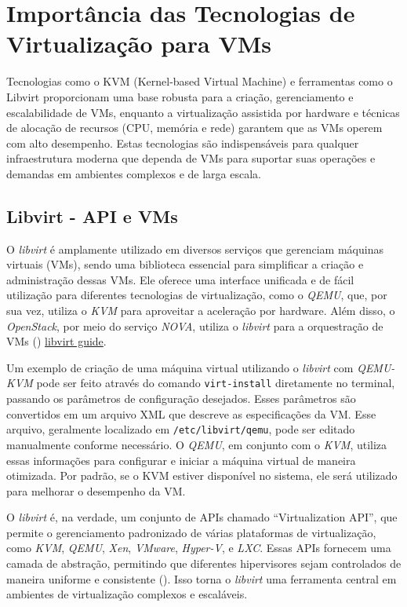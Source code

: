 \section{Importância das Tecnologias de Virtualização para VMs}

Tecnologias como o KVM (Kernel-based Virtual Machine) e ferramentas como o Libvirt proporcionam uma base robusta para a criação, gerenciamento e escalabilidade de VMs, enquanto a virtualização assistida por hardware e técnicas de alocação de recursos (CPU, memória e rede) garantem que as VMs operem com alto desempenho. Estas tecnologias são indispensáveis para qualquer infraestrutura moderna que dependa de VMs para suportar suas operações e demandas em ambientes complexos e de larga escala.

\subsection{Libvirt - API e VMs}
O \textit{libvirt} é amplamente utilizado em diversos serviços que gerenciam máquinas virtuais (VMs), sendo uma biblioteca essencial para simplificar a criação e administração dessas VMs. Ele oferece uma interface unificada e de fácil utilização para diferentes tecnologias de virtualização, como o \textit{QEMU}, que, por sua vez, utiliza o \textit{KVM} para aproveitar a aceleração por hardware. Além disso, o \textit{OpenStack}, por meio do serviço \textit{NOVA}, utiliza o \textit{libvirt} para a orquestração de VMs (\cite{DocumentacaoOpenstack}) \href{https://docs.openstack.org/kolla-ansible/latest/reference/compute/libvirt-guide.html}{libvirt guide}.

Um exemplo de criação de uma máquina virtual utilizando o \textit{libvirt} com \textit{QEMU-KVM} pode ser feito através do comando \texttt{virt-install} diretamente no terminal, passando os parâmetros de configuração desejados. Esses parâmetros são convertidos em um arquivo XML que descreve as especificações da VM. Esse arquivo, geralmente localizado em \texttt{/etc/libvirt/qemu}, pode ser editado manualmente conforme necessário. O \textit{QEMU}, em conjunto com o \textit{KVM}, utiliza essas informações para configurar e iniciar a máquina virtual de maneira otimizada. Por padrão, se o KVM estiver disponível no sistema, ele será utilizado para melhorar o desempenho da VM.

O \textit{libvirt} é, na verdade, um conjunto de APIs chamado ``Virtualization API'', que permite o gerenciamento padronizado de várias plataformas de virtualização, como \textit{KVM}, \textit{QEMU}, \textit{Xen}, \textit{VMware}, \textit{Hyper-V}, e \textit{LXC}. Essas APIs fornecem uma camada de abstração, permitindo que diferentes hipervisores sejam controlados de maneira uniforme e consistente (\cite{chirammal2016mastering}). Isso torna o \textit{libvirt} uma ferramenta central em ambientes de virtualização complexos e escaláveis.

